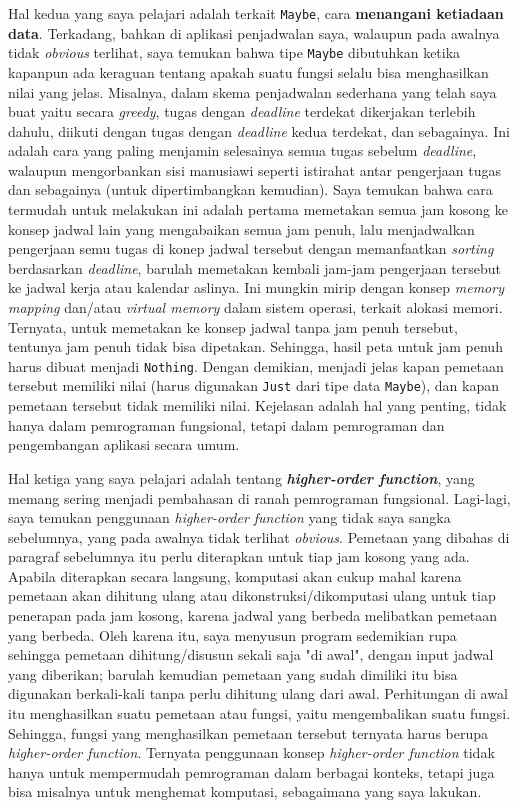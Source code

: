 \documentclass{article}
\begin{document}
Hal kedua yang saya pelajari adalah terkait \verb|Maybe|, cara \textbf{menangani ketiadaan data}. Terkadang, bahkan di aplikasi penjadwalan saya, walaupun pada awalnya tidak \textit{obvious} terlihat, saya temukan bahwa tipe \verb|Maybe| dibutuhkan ketika kapanpun ada keraguan tentang apakah suatu fungsi selalu bisa menghasilkan nilai yang jelas. Misalnya, dalam skema penjadwalan sederhana yang telah saya buat yaitu secara \textit{greedy}, tugas dengan \textit{deadline} terdekat dikerjakan terlebih dahulu, diikuti dengan tugas dengan \textit{deadline} kedua terdekat, dan sebagainya. Ini adalah cara yang paling menjamin selesainya semua tugas sebelum \textit{deadline}, walaupun mengorbankan sisi manusiawi seperti istirahat antar pengerjaan tugas dan sebagainya (untuk dipertimbangkan kemudian). Saya temukan bahwa cara termudah untuk melakukan ini adalah pertama memetakan semua jam kosong ke konsep jadwal lain yang mengabaikan semua jam penuh, lalu menjadwalkan pengerjaan semu tugas di konep jadwal tersebut dengan memanfaatkan \textit{sorting} berdasarkan \textit{deadline}, barulah memetakan kembali jam-jam pengerjaan tersebut ke jadwal kerja atau kalendar aslinya. Ini mungkin mirip dengan konsep \textit{memory mapping} dan/atau \textit{virtual memory} dalam sistem operasi, terkait alokasi memori. Ternyata, untuk memetakan ke konsep jadwal tanpa jam penuh tersebut, tentunya jam penuh tidak bisa dipetakan. Sehingga, hasil peta untuk jam penuh harus dibuat menjadi \verb|Nothing|. Dengan demikian, menjadi jelas kapan pemetaan tersebut memiliki nilai (harus digunakan \verb|Just| dari tipe data \verb|Maybe|), dan kapan pemetaan tersebut tidak memiliki nilai. Kejelasan adalah hal yang penting, tidak hanya dalam pemrograman fungsional, tetapi dalam pemrograman dan pengembangan aplikasi secara umum.

Hal ketiga yang saya pelajari adalah tentang \textbf{\textit{higher-order function}}, yang memang sering menjadi pembahasan di ranah pemrograman fungsional. Lagi-lagi, saya temukan penggunaan \textit{higher-order function} yang tidak saya sangka sebelumnya, yang pada awalnya tidak terlihat \textit{obvious}. Pemetaan yang dibahas di paragraf sebelumnya itu perlu diterapkan untuk tiap jam kosong yang ada. Apabila diterapkan secara langsung, komputasi akan cukup mahal karena pemetaan akan dihitung ulang atau dikonstruksi/dikomputasi ulang untuk tiap penerapan pada jam kosong, karena jadwal yang berbeda melibatkan pemetaan yang berbeda. Oleh karena itu, saya menyusun program sedemikian rupa sehingga pemetaan dihitung/disusun sekali saja "di awal", dengan input jadwal yang diberikan; barulah kemudian pemetaan yang sudah dimiliki itu bisa digunakan berkali-kali tanpa perlu dihitung ulang dari awal. Perhitungan di awal itu menghasilkan suatu pemetaan atau fungsi, yaitu mengembalikan suatu fungsi. Sehingga, fungsi yang menghasilkan pemetaan tersebut ternyata harus berupa \textit{higher-order function}. Ternyata penggunaan konsep \textit{higher-order function} tidak hanya untuk mempermudah pemrograman dalam berbagai konteks, tetapi juga bisa misalnya untuk menghemat komputasi, sebagaimana yang saya lakukan.
\end{document}
